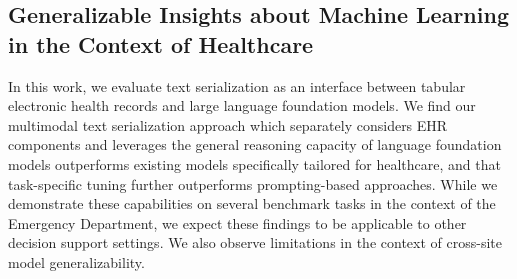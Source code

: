 \documentclass[pmlr]{jmlr}%
\begin{document}

\subsection*{Generalizable Insights about Machine Learning in the Context of Healthcare}

In this work, we evaluate text serialization as an interface between tabular electronic health records and large language foundation models. We find our multimodal text serialization approach which separately considers EHR components and leverages the general reasoning capacity of language foundation models outperforms existing  models specifically tailored for healthcare, and that task-specific tuning further outperforms prompting-based approaches. While we demonstrate these capabilities on several benchmark tasks in the context of the Emergency Department, we expect these findings to be applicable to other decision support settings. We also observe limitations in the context of cross-site model generalizability.  

\end{document}
